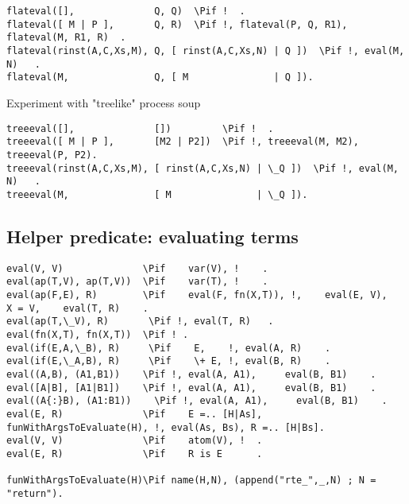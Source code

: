 \begin{verbatim}
flateval([],              Q, Q)  \Pif !  .
flateval([ M | P ],       Q, R)  \Pif !, flateval(P, Q, R1),  flateval(M, R1, R)  .
flateval(rinst(A,C,Xs,M), Q, [ rinst(A,C,Xs,N) | Q ])  \Pif !, eval(M, N)   .
flateval(M,               Q, [ M               | Q ]).
\end{verbatim}

Experiment with "treelike" process soup
\begin{verbatim}
treeeval([],              [])         \Pif !  .
treeeval([ M | P ],       [M2 | P2])  \Pif !, treeeval(M, M2), treeeval(P, P2).
treeeval(rinst(A,C,Xs,M), [ rinst(A,C,Xs,N) | \_Q ])  \Pif !, eval(M, N)   .
treeeval(M,               [ M               | \_Q ]).
\end{verbatim}

\subsection{Helper predicate: evaluating terms}

\begin{verbatim}
eval(V, V)              \Pif    var(V), !    .
eval(ap(T,V), ap(T,V))  \Pif    var(T), !    .
eval(ap(F,E), R)        \Pif    eval(F, fn(X,T)), !,    eval(E, V),    X = V,    eval(T, R)    .
eval(ap(T,\_V), R)       \Pif !, eval(T, R)   .
eval(fn(X,T), fn(X,T))  \Pif ! .
eval(if(E,A,\_B), R)     \Pif    E,    !, eval(A, R)    .
eval(if(E,\_A,B), R)     \Pif    \+ E, !, eval(B, R)    .
eval((A,B), (A1,B1))    \Pif !, eval(A, A1),     eval(B, B1)    .
eval([A|B], [A1|B1])    \Pif !, eval(A, A1),     eval(B, B1)    .
eval((A{:}B), (A1:B1))    \Pif !, eval(A, A1),     eval(B, B1)    .
eval(E, R)              \Pif    E =.. [H|As], funWithArgsToEvaluate(H), !, eval(As, Bs), R =.. [H|Bs].
eval(V, V)              \Pif    atom(V), !  .
eval(E, R)              \Pif    R is E      .

funWithArgsToEvaluate(H)\Pif name(H,N), (append("rte_",_,N) ; N = "return").
\end{verbatim}
